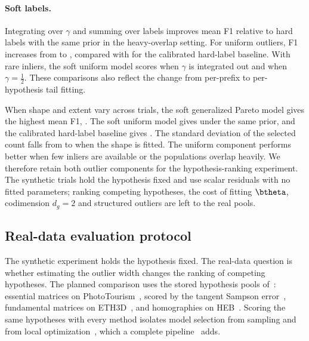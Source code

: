 \documentclass[10pt,twocolumn,letterpaper]{article}
\newcommand{\mname}[1]{\texorpdfstring{#1\xspace}{#1}}
\newcommand{\phototourism}{\mname{PhotoTourism}}
\newcommand{\ethd}{\mname{ETH3D}}
\newcommand{\heb}{\mname{HEB}}
\begin{document}
\paragraph{Soft labels.}
Integrating over $\gamma$ and summing over labels improves mean F1
relative to hard labels with the same prior in the heavy-overlap
setting. For uniform outliers, F1 increases from
 to
, compared with
 for the calibrated
hard-label baseline. With rare inliers, the soft uniform model scores
 when $\gamma$ is
integrated out and  when
$\gamma=\tfrac12$. These comparisons also reflect the change from
per-prefix to per-hypothesis tail fitting.

When shape and extent vary across trials, the soft generalized Pareto
model gives the highest mean F1, .
The soft uniform model gives 
under the same prior, and the calibrated hard-label baseline gives
. The standard deviation of
the selected count falls from 
to  when the shape is fitted.
The uniform component performs better when few inliers are available
or the populations overlap heavily. We therefore retain both outlier
components for the hypothesis-ranking experiment. The synthetic
trials hold the hypothesis fixed and use scalar residuals with no fitted
parameters; ranking competing hypotheses, the cost of fitting
$\btheta$, codimension $d_g=2$ and structured outliers are left to the
real pools.

\subsection{Real-data evaluation protocol}
\label{sec:real}

The synthetic experiment holds the hypothesis fixed. The real-data
question is whether estimating the outlier width changes the ranking
of competing hypotheses. The planned comparison uses the stored
hypothesis pools of~\cite{Pritts2026}: essential matrices on
\phototourism~\cite{Jin2021}, scored by the tangent Sampson
error~\cite{Terekhov2023}, fundamental matrices on \ethd~\cite{Schoeps2017},
and homographies on \heb~\cite{Barath2023}. Scoring the same hypotheses
with every method isolates model selection from sampling and from local
optimization~\cite{Chum2003,Lebeda2012}, which a complete
pipeline~\cite{Barath2025superansac} adds.
\end{document}
